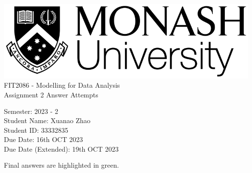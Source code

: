 \begin{titlepage}

  \includegraphics[width=0.25\linewidth]{monashlogo.png} \\
  
  
  \pstitle
  FIT2086 - Modelling for Data Analysis \\
  Assignment 2 Answer Attempts

  \vspace{2cm}
  
  \pspara
  Semester: 2023 - 2 \\
  Student Name: Xuanao Zhao \\
  Student ID: 33332835 \\
  Due Date: 16th OCT 2023 \\
  Due Date (Extended): 19th OCT 2023

  \vspace{5cm}

  Final answers are highlighted in \colorbox{gbg}{green}.

\end{titlepage}